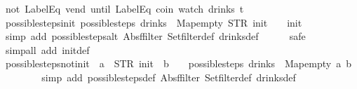 \begin{isabellebody}
{}%
\isamarkupfalse%
\ {\isachardoublequoteopen}{\isacharparenleft}not\ {\isacharparenleft}LabelEq\ {\isacharprime}{\isacharprime}vend{\isacharprime}{\isacharprime}{\isacharparenright}\ until\ {\isacharparenleft}LabelEq\ {\isacharprime}{\isacharprime}coin{\isacharprime}{\isacharprime}{\isacharparenright}{\isacharparenright}\ {\isacharparenleft}watch\ drinks\ t{\isacharparenright}{\isachardoublequoteclose}\isanewline
%
\isadelimproof
\ \ %
\endisadelimproof
%
\isatagproof
{}\isamarkupfalse%
%
\endisatagproof
{\isafoldproof}%
%
\isadelimproof
\isanewline
%
\endisadelimproof
\isanewline
{}\isamarkupfalse%
\ possible{\isacharunderscore}steps{\isacharunderscore}init{\isacharcolon}\ {\isachardoublequoteopen}possible{\isacharunderscore}steps\ drinks\ {}\ Map{\isachardot}empty\ STR\ {\isacharprime}{\isacharprime}init{\isacharprime}{\isacharprime}\ {\isacharbrackleft}{\isacharbrackright}\ {\isacharequal}\ {\isacharbraceleft}{\isacharbar}{\isacharparenleft}{}{\isacharcomma}\ init{\isacharparenright}{\isacharbar}{\isacharbraceright}{\isachardoublequoteclose}\isanewline
%
\isadelimproof
\ \ \ \ %
\endisadelimproof
%
\isatagproof
{}\isamarkupfalse%
\ {\isacharparenleft}simp\ add{\isacharcolon}\ possible{\isacharunderscore}steps{\isacharunderscore}alt\ Abs{\isacharunderscore}ffilter\ Set{\isachardot}filter{\isacharunderscore}def\ drinks{\isacharunderscore}def{\isacharparenright}\isanewline
\ \ \ \ \isamarkupfalse%
\ safe\isanewline
\ \ \isamarkupfalse%
\ {\isacharparenleft}simp{\isacharunderscore}all\ add{\isacharcolon}\ init{\isacharunderscore}def{\isacharparenright}%
\endisatagproof
{\isafoldproof}%
%
\isadelimproof
\isanewline
%
\endisadelimproof
\isanewline
{}\isamarkupfalse%
\ possible{\isacharunderscore}steps{\isacharunderscore}not{\isacharunderscore}init{\isacharcolon}\ {\isachardoublequoteopen}{\isasymnot}\ {\isacharparenleft}a\ {\isacharequal}\ STR\ {\isacharprime}{\isacharprime}init{\isacharprime}{\isacharprime}\ {\isasymand}\ b\ {\isacharequal}\ {\isacharbrackleft}{\isacharbrackright}{\isacharparenright}\ {\isasymLongrightarrow}\ possible{\isacharunderscore}steps\ drinks\ {}\ Map{\isachardot}empty\ a\ b\ {\isacharequal}\ {\isacharbraceleft}{\isacharbar}{\isacharbar}{\isacharbraceright}{\isachardoublequoteclose}\isanewline
%
\isadelimproof
\ \ \ \ %
\endisadelimproof
%
\isatagproof
{}\isamarkupfalse%
\ {\isacharparenleft}simp\ add{\isacharcolon}\ possible{\isacharunderscore}steps{\isacharunderscore}def\ Abs{\isacharunderscore}ffilter\ Set{\isachardot}filter{\isacharunderscore}def\ drinks{\isacharunderscore}def{\isacharparenright}\isanewline

\end{isabellebody}
